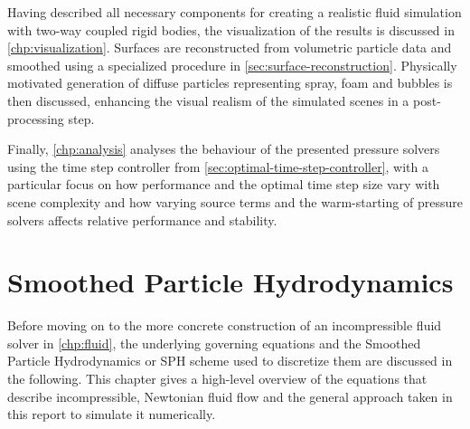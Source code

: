 \documentclass[oneside, a4paper]{book}
\begin{document}
Having described all necessary components for creating a realistic fluid simulation with two-way coupled rigid bodies, the visualization of the results is discussed in \autoref{chp:visualization}. Surfaces are reconstructed from volumetric particle data and smoothed using a specialized procedure in \autoref{sec:surface-reconstruction}. Physically motivated generation of diffuse particles representing spray, foam and bubbles is then discussed, enhancing the visual realism of the simulated scenes in a post-processing step.

Finally, \autoref{chp:analysis} analyses the behaviour of the presented pressure solvers using the time step controller from \autoref{sec:optimal-time-step-controller}, with a particular focus on how performance and the optimal time step size vary with scene complexity and how varying source terms and the warm-starting of pressure solvers affects relative performance and stability. 







\chapter{Smoothed Particle Hydrodynamics}\label{chp:sph}
    Before moving on to the more concrete construction of an incompressible fluid solver in \autoref{chp:fluid}, the underlying governing equations and the Smoothed Particle Hydrodynamics or SPH scheme used to discretize them are discussed in the following. This chapter gives a high-level overview of the equations that describe incompressible, Newtonian fluid flow and the general approach taken in this report to simulate it numerically.
\end{document}

